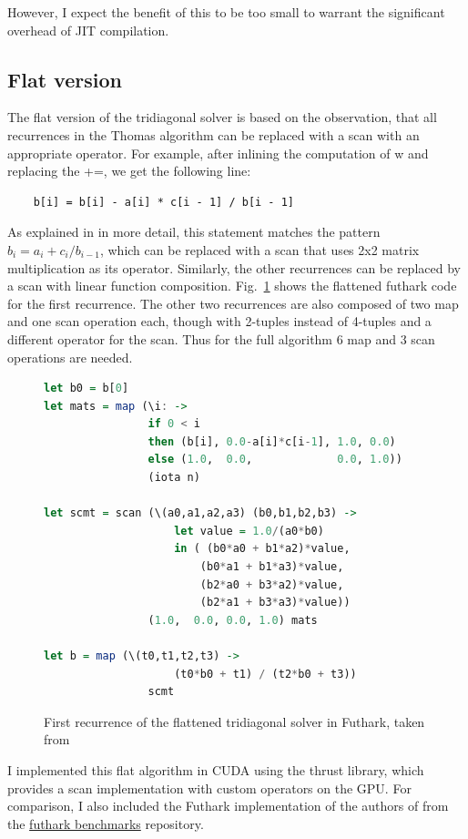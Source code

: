 \documentclass[a4paper,oneside]{memoir}
\begin{document}
However, I expect the benefit of this to be too small to warrant the significant overhead of JIT compilation.

\subsection{Flat version}
The flat version of the tridiagonal solver is based on the observation, 
that all recurrences in the Thomas algorithm can be replaced with a scan with an appropriate operator. 
For example, after inlining the computation of w and replacing the +=, we get the following line: 
\begin{verbatim}
    b[i] = b[i] - a[i] * c[i - 1] / b[i - 1] 
\end{verbatim}
As explained in \cite{andreetta2016finpar} in more detail, this statement matches the pattern $b_i = a_i + c_i / b_{i-1}$, which can be replaced with a scan that uses 2x2 matrix multiplication as its operator.
Similarly, the other recurrences can be replaced by a scan with linear function composition.
Fig.~\ref{fig:thomas_flat} shows the flattened futhark code for the first recurrence.
The other two recurrences are also composed of two map and one scan operation each, though with 2-tuples instead of 4-tuples and a different operator for the scan. Thus for the full algorithm 6 map and 3 scan operations are needed.

\begin{figure}[hbtp]
    \caption{First recurrence of the flattened tridiagonal solver in Futhark, taken from \cite{andreetta2016finpar}}
    \label{fig:thomas_flat}
    \begin{lstlisting}[language=haskell,frame=single]
let b0 = b[0]
let mats = map (\i: ->
                if 0 < i
                then (b[i], 0.0-a[i]*c[i-1], 1.0, 0.0)
                else (1.0,  0.0,             0.0, 1.0))
                (iota n)

let scmt = scan (\(a0,a1,a2,a3) (b0,b1,b2,b3) ->
                    let value = 1.0/(a0*b0)
                    in ( (b0*a0 + b1*a2)*value,
                        (b0*a1 + b1*a3)*value,
                        (b2*a0 + b3*a2)*value,
                        (b2*a1 + b3*a3)*value))
                (1.0,  0.0, 0.0, 1.0) mats

let b = map (\(t0,t1,t2,t3) ->
                    (t0*b0 + t1) / (t2*b0 + t3))
                scmt
    \end{lstlisting}
\end{figure}


I implemented this flat algorithm in CUDA using the thrust library, which provides a scan implementation with custom operators on the GPU.
For comparison, I also included the Futhark implementation of the authors of \cite{andreetta2016finpar} from the 
\href{https://github.com/diku-dk/futhark-benchmarks/blob/bf5112d0841866dc7370586f2e2a7b48467d2d97/finpar/LocVolCalib.fut}{futhark benchmarks}
repository.
\end{document}
